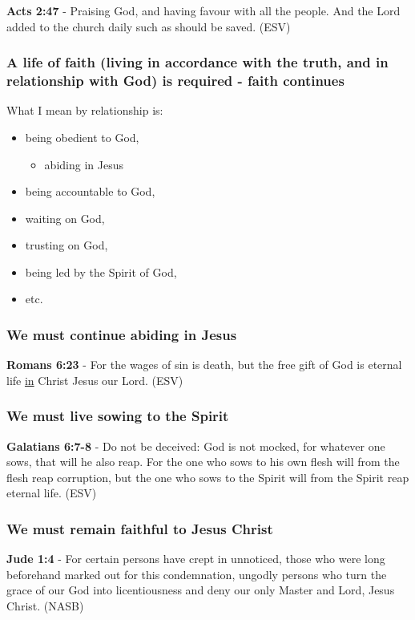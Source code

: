 \documentclass[11pt]{article}
\begin{document}
\textbf{Acts 2:47} - Praising God, and having favour with all the people. And the Lord added to the church daily such as should be saved. (ESV)

\subsubsection{A life of faith (living in accordance with the truth, and in relationship with God) is required - faith continues}
\label{sec:org7d2e4fc}
What I mean by relationship is:
\begin{itemize}
\item being obedient to God,
\begin{itemize}
\item abiding in Jesus
\end{itemize}
\item being accountable to God,
\item waiting on God,
\item trusting on God,
\item being led by the Spirit of God,
\item etc.
\end{itemize}

\subsubsection{We must continue abiding in Jesus}
\label{sec:orgfd3a91f}

\textbf{Romans 6:23} - For the wages of sin is death, but the free gift of God is eternal life \uline{in} Christ Jesus our Lord. (ESV)

\subsubsection{We must live sowing to the Spirit}
\label{sec:org4d1bf85}

\textbf{Galatians 6:7-8} - Do not be deceived: God is not mocked, for whatever one sows, that will he also reap. For the one who sows to his own flesh will from the flesh reap corruption, but the one who sows to the Spirit will from the Spirit reap eternal life. (ESV)

\subsubsection{We must remain faithful to Jesus Christ}
\label{sec:org0ab39ed}

\textbf{Jude 1:4} - For certain persons have crept in unnoticed, those who were long beforehand marked out for this condemnation, ungodly persons who turn the grace of our God into licentiousness and deny our only Master and Lord, Jesus Christ. (NASB)
\end{document}
